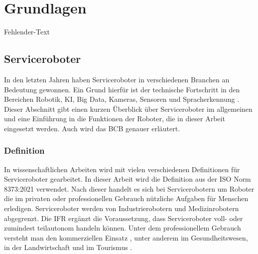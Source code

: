 \newpage
\section{Grundlagen}\label{Grundlagen}
Fehlender-Text

\subsection{Serviceroboter}
In den letzten Jahren haben Serviceroboter in verschiedenen Branchen an Bedeutung gewonnen. Ein Grund hierfür ist der technische Fortschritt in den Bereichen Robotik, KI, Big Data, Kameras, Sensoren und Spracherkennung \cite[S.~424]{Paluch2020}. Dieser Abschnitt gibt einen kurzen Überblick über Serviceroboter im allgemeinen und eine Einführung in die Funktionen der Roboter, die in dieser Arbeit eingesetzt werden. Auch wird das \ac{BCB} genauer erläutert.

\subsubsection{Definition}
In wissenschaftlichen Arbeiten wird mit vielen verschiedenen Definitionen für Serviceroboter gearbeitet. In dieser Arbeit wird die Definition aus der ISO Norm 8373:2021 \cite[Kap.~3]{ISO2021} verwendet. Nach dieser handelt es sich bei Servicerobotern um Roboter die im privaten oder professionellen Gebrauch nützliche Aufgaben für Menschen erledigen. Serviceroboter werden von Industrierobotern und Medizinrobotern abgegrenzt. Die \ac{IFR} \cite{IFR2024} ergänzt die Voraussetzung, dass Serviceroboter voll- oder zumindest teilautonom handeln können. Unter dem professionellem Gebrauch versteht man den kommerziellen Einsatz \cite[S.~4]{GonzalezAguirre2021}, unter anderem im Gesundheitswesen, in der Landwirtschaft und im Tourismus \cite[S.~9]{GonzalezAguirre2021}.

